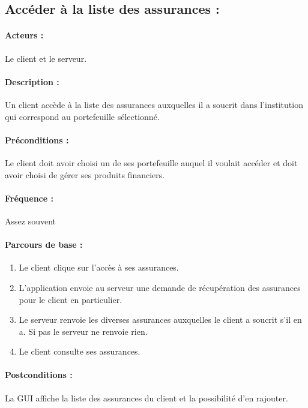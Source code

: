\documentclass[../annexe.tex]{subfiles}
\begin{document}
\newpage

\subsection{Accéder à la liste des assurances :}

\paragraph{Acteurs :} Le client et le serveur.

\paragraph{Description :} Un client accède à la liste des assurances auxquelles il a soucrit dans l'institution qui correspond au portefeuille sélectionné.

\paragraph{Préconditions :} Le client doit avoir choisi un de ses portefeuille auquel il voulait accéder et doit avoir choisi de gérer ses produits financiers.

\paragraph{Fréquence :} Assez souvent

\paragraph{Parcours de base :} 

	\begin{enumerate}
		\item Le client clique sur l'accès à ses assurances.
		\item L'application envoie au serveur une demande de récupération des assurances pour le client en particulier.
		\item Le serveur renvoie les diverses assurances auxquelles le client a soucrit s'il en a. 
		Si pas le serveur ne renvoie rien.
		\item Le client consulte ses assurances.
	\end{enumerate}

\paragraph{Postconditions :} La GUI affiche la liste des assurances du client et la possibilité d'en rajouter.
\end{document}
